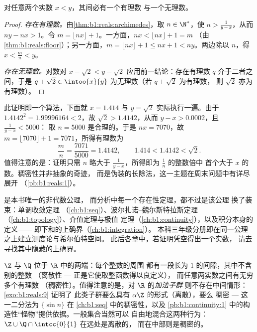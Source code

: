 \begin{theorem}\label{thm:b1:reals:density}
对任意两个实数 $x < y$，其间必有一个有理数
与一个无理数。
\end{theorem}

\begin{proof}
\emph{存在有理数。}由\cref{thm:b1:reals:archimedes}，取 $n \in
\N^*$，使 $n > \frac{1}{y - x}$，从而 $ny - nx > 1$。令 $m = \lfloor
nx \rfloor + 1$。一方面，$nx < \lfloor nx \rfloor + 1 = m$
（由\cref{thm:b1:reals:floor}）；另一方面，$m = \lfloor nx \rfloor +
1 \leq nx + 1 < ny$。两边除以 $n$，得 $x < \frac mn < y$。

\emph{存在无理数。}对数对 $x -
\sqrt 2 < y - \sqrt 2$ 应用前一结论：存在有理数 $q$ 介于二者之间，于是
$q + \sqrt 2 \in \intoo{x}{y}$ 为无理数（若 $q + \sqrt 2$ 为有理数，
则 $\sqrt 2$ 亦为有理数）。
\end{proof}

\begin{example}[稠密性证明的实际运行]\label{ex:b1:reals:densityrun}
此证明即一个算法，下面就 $x = 1.414$ 与
$y = \sqrt 2$ 实际执行一遍。由于 $1.4142^2 = 1.99996164 < 2$，故 $\sqrt 2
> 1.4142$，从而 $y - x > 0.0002$，且 $\frac{1}{y - x} < 5000$：
取 $n = 5000$ 是合理的。于是 $nx = 7070$，故 $m = \lfloor
7070 \rfloor + 1 = 7071$，所得有理数为
\[
\frac{m}{n} = \frac{7071}{5000} = 1.4142,
\qquad
1.414 < 1.4142 < \sqrt 2 .
\]
值得注意的是：证明只需 $n$ 略大于
$\frac{1}{y-x}$，所得即为 $\frac 1n$ 的整数倍中
首个大于 $x$ 的数。稠密性并非抽象的奇迹，
而是伪装的长除法，这一主题在周末问题中有详尽展开
（\cref{pb:b1:reals:1}）。
\end{example}

\begin{remark}[完备性接下来在何处使用]
 是本书唯一的非代数公理，
而分析中每一个存在性定理，都不过是该公理
换了装束：单调收敛定理
（\cref{ch:b1:seq}）、波尔扎诺--魏尔斯特拉斯定理
（\cref{ch:b1:topology}）、介值定理与极值
定理（\cref{ch:b1:continuity}），以及积分本身的定义——
即下和的上确界（\cref{ch:b1:integration}）。
本科三年级分册即在同一公理之上建立测度论与希尔伯特空间。
此后各章中，若证明凭空得出一个实数，
请去寻找其中隐藏的上确界。
\end{remark}

\begin{remark}[离散性与稠密性之间]
$\Z$ 与 $\Q$ 位于 $\R$ 中的两端：每个整数的周围
都有一段长为 $1$ 的间隙，其中不含别的整数
（离散性 --- 正是它使取整函数得以良定义），
而任意两实数之间有无穷多个有理数
（稠密性）。值得注意的是，对 $\R$ 的\emph{加法子群}
则不存在中间情形：\cref{exo:b1:reals:9} 证明了
此类子群要么具有 $\alpha\Z$ 的形式（离散），要么
稠密 --- 这一二分法为 $\{\sin n\}$ 在
\cref{ch:b1:seq} 中的稠密性，以及
\cref{pb:b1:continuity:1} 中的构造性“怪物”提供依据。一般集合当然可以
自由地混合这两种行为：$\Z \cup \Q\cap\intcc{0}{1}$ 在远处是离散的，
而在中部则是稠密的。
\end{remark}

